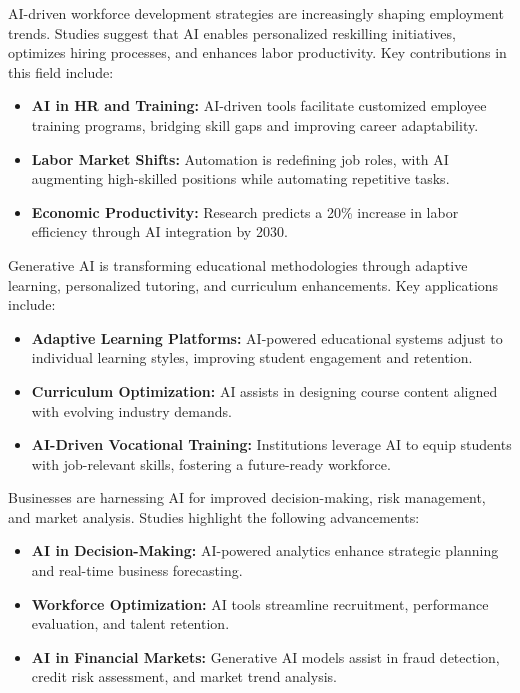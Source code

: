 \documentclass[a4paper,headinclude=on,footinclude=on,12pt,oneside]{scrbook}
\begin{document}
AI-driven workforce development strategies are increasingly shaping employment trends. Studies suggest that AI enables personalized reskilling initiatives, optimizes hiring processes, and enhances labor productivity. Key contributions in this field include:
\begin{itemize}
	\item \textbf{AI in HR and Training:} AI-driven tools facilitate customized employee training programs, bridging skill gaps and improving career adaptability.
	\item \textbf{Labor Market Shifts:} Automation is redefining job roles, with AI augmenting high-skilled positions while automating repetitive tasks.
	\item \textbf{Economic Productivity:} Research predicts a 20\% increase in labor efficiency through AI integration by 2030.
\end{itemize}


Generative AI is transforming educational methodologies through adaptive learning, personalized tutoring, and curriculum enhancements. Key applications include:
\begin{itemize}
	\item \textbf{Adaptive Learning Platforms:} AI-powered educational systems adjust to individual learning styles, improving student engagement and retention.
	\item \textbf{Curriculum Optimization:} AI assists in designing course content aligned with evolving industry demands.
	\item \textbf{AI-Driven Vocational Training:} Institutions leverage AI to equip students with job-relevant skills, fostering a future-ready workforce.
\end{itemize}


Businesses are harnessing AI for improved decision-making, risk management, and market analysis. Studies highlight the following advancements:
\begin{itemize}
	\item \textbf{AI in Decision-Making:} AI-powered analytics enhance strategic planning and real-time business forecasting.
	\item \textbf{Workforce Optimization:} AI tools streamline recruitment, performance evaluation, and talent retention.
	\item \textbf{AI in Financial Markets:} Generative AI models assist in fraud detection, credit risk assessment, and market trend analysis.
\end{itemize}
\end{document}
